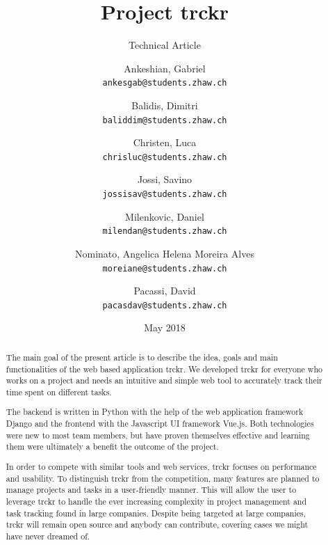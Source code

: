 \documentclass[a4paper, 12pt, headsepline]{scrartcl}
\title{Project trckr}
\subtitle{Technical Article}
\date{May 2018}
\author{
Ankeshian, Gabriel\\
\texttt{ankesgab@students.zhaw.ch}
\and
Balidis, Dimitri\\
\texttt{baliddim@students.zhaw.ch}
\and
Christen, Luca\\
\texttt{chrisluc@students.zhaw.ch}
\and
Jossi, Savino\\
\texttt{jossisav@students.zhaw.ch}
\and
Milenkovic, Daniel\\
\texttt{milendan@students.zhaw.ch}
\and
Nominato, Angelica Helena Moreira Alves\\
\texttt{moreiane@students.zhaw.ch}
\and
Pacassi, David\\
\texttt{pacasdav@students.zhaw.ch}}
\begin{document}
\maketitle
\pagebreak


\begin{abstract}
  The main goal of the present article is to describe the idea, goals and main
  functionalities of the web based application trckr. We developed trckr for
  everyone who works on a project and needs an intuitive and simple web tool to
  accurately track their time spent on different tasks.

  The backend is written in Python with the help of the web application
  framework Django and the frontend with the Javascript UI framework Vue.js.
  Both technologies were new to most team members, but have proven themselves
  effective and learning them were ultimately a benefit the outcome of the
  project.

  In order to compete with similar tools and web services, trckr focuses on
  performance and usability. To distinguish trckr from the competition, many
  features are planned to manage projects and tasks in a user-friendly manner.
  This will allow the user to leverage trckr to handle the ever increasing
  complexity in project management and task tracking found in large companies.
  Despite being targeted at large companies, trckr will remain open source and
  anybody can contribute, covering cases we might have never dreamed of.
\end{abstract}

\clearpage


\tableofcontents

\clearpage
\end{document}
